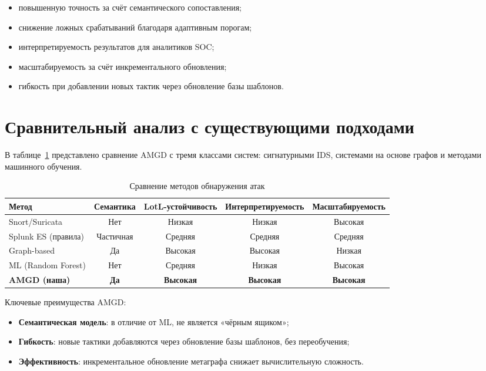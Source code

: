 \noindent
\begin{itemize}
    \item повышенную точность за счёт семантического сопоставления;
    \item снижение ложных срабатываний благодаря адаптивным порогам;
    \item интерпретируемость результатов для аналитиков SOC;
    \item масштабируемость за счёт инкрементального обновления;
    \item гибкость при добавлении новых тактик через обновление базы шаблонов.
\end{itemize}

\section{Сравнительный анализ с существующими подходами}\label{sec:ch3/comparison}

В таблице~\ref{tab:comparison} представлено сравнение AMGD с тремя классами систем: сигнатурными IDS, системами на основе графов и методами машинного обучения.

\begin{table}[ht]
\centering
\caption{Сравнение методов обнаружения атак}
\label{tab:comparison}
\begin{tabular}{lcccc}
\toprule
Метод & Семантика & LotL-устойчивость & Интерпретируемость & Масштабируемость \\
\midrule
Snort/Suricata & Нет & Низкая & Низкая & Высокая \\
Splunk ES (правила) & Частичная & Средняя & Средняя & Средняя \\
Graph-based~\cite{Gorbachev2018} & Да & Высокая & Высокая & Низкая \\
ML (Random Forest) & Нет & Средняя & Низкая & Высокая \\
\textbf{AMGD (наша)} & \textbf{Да} & \textbf{Высокая} & \textbf{Высокая} & \textbf{Высокая} \\
\bottomrule
\end{tabular}
\end{table}

Ключевые преимущества AMGD:
\begin{itemize}
    \item \textbf{Семантическая модель}: в отличие от ML, не является «чёрным ящиком»;
    \item \textbf{Гибкость}: новые тактики добавляются через обновление базы шаблонов, без переобучения;
    \item \textbf{Эффективность}: инкрементальное обновление метаграфа снижает вычислительную сложность.
\end{itemize}

